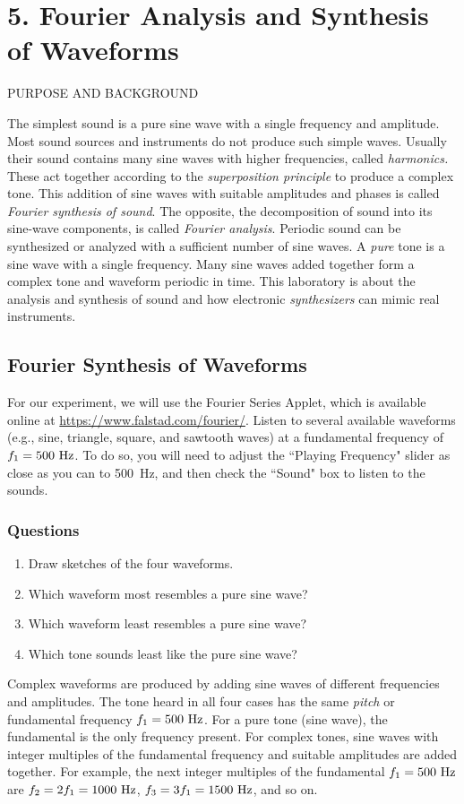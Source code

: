\documentclass[11pt]{NSF}
\def\ben{\begin{enumerate}}
\def\een{\end{enumerate}}
\def\i{\item{}}
\begin{document}
     
\section{5. Fourier Analysis and Synthesis of Waveforms}

PURPOSE AND BACKGROUND

The simplest sound is a pure sine wave with a single frequency and amplitude.
Most sound sources and instruments do not produce such simple waves. Usually
their sound contains many sine waves with higher frequencies, called {\em harmonics.}
These act together according to the {\em superposition principle} to produce a
complex tone. This addition of sine waves with suitable amplitudes and phases
is called {\em Fourier synthesis of sound}. 
The opposite, the decomposition of sound
into its sine-wave components, is called {\em Fourier analysis}. 
Periodic sound can
be synthesized or analyzed with a sufficient number of sine waves. 
A {\em pure} tone is a sine wave with a single frequency. 
Many sine waves added together form a
complex tone and waveform periodic in time. This laboratory is about the
analysis and synthesis of sound and how electronic 
{\em synthesizers} can mimic real instruments.

\subsection{Fourier Synthesis of Waveforms}

For our experiment, we will use the 
Fourier Series Applet, which is available online at 
\url{https://www.falstad.com/fourier/}.
Listen to several available waveforms (e.g.,  sine, triangle, 
square, and sawtooth waves) at a fundamental frequency of 
$f_1 = 500~{\rm Hz}$.
To do so, you will need to adjust the ``Playing Frequency" 
slider as close as you can to 500~Hz,  
and then check the ``Sound" box to listen to the sounds.

\subsubsection*{Questions}
\ben
\i Draw sketches of the four waveforms.

\i Which waveform most resembles a pure sine wave?

\i Which waveform least resembles a pure sine wave?

\i Which tone sounds least like the pure sine wave?
\een

Complex waveforms are produced by adding sine waves of different frequencies
and amplitudes. The tone heard in all four cases has the same {\em pitch} or
fundamental frequency $f_1= 500~{\rm Hz}$. For a pure tone (sine wave), the fundamental
is the only frequency present. For complex tones, sine waves with integer
multiples of the fundamental frequency and suitable amplitudes are added
together. For example, the next integer multiples of the fundamental 
$f_1 = 500~{\rm Hz}$ are 
$f_2 = 2 f_1= 1000~{\rm Hz}$, 
$f_3 = 3 f_1 = 1500~{\rm Hz}$, and so on.
\end{document}
